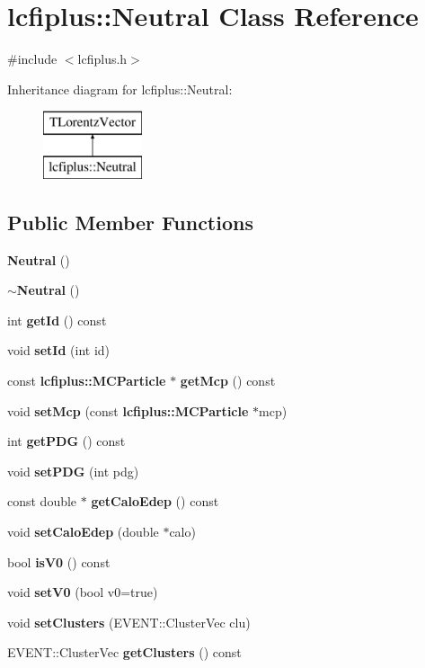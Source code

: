 \section{lcfiplus\+:\+:Neutral Class Reference}
\label{classlcfiplus_1_1Neutral}


{\ttfamily \#include $<$lcfiplus.\+h$>$}

Inheritance diagram for lcfiplus\+:\+:Neutral\+:\begin{figure}[H]
\begin{center}
\leavevmode
\includegraphics[height=2.000000cm]{classlcfiplus_1_1Neutral}
\end{center}
\end{figure}
\subsection*{Public Member Functions}
\begin{DoxyCompactItemize}
\item 
\textbf{ Neutral} ()
\item 
\textbf{ $\sim$\+Neutral} ()
\item 
int \textbf{ get\+Id} () const
\item 
void \textbf{ set\+Id} (int id)
\item 
const \textbf{ lcfiplus\+::\+M\+C\+Particle} $\ast$ \textbf{ get\+Mcp} () const
\item 
void \textbf{ set\+Mcp} (const \textbf{ lcfiplus\+::\+M\+C\+Particle} $\ast$mcp)
\item 
int \textbf{ get\+P\+DG} () const
\item 
void \textbf{ set\+P\+DG} (int pdg)
\item 
const double $\ast$ \textbf{ get\+Calo\+Edep} () const
\item 
void \textbf{ set\+Calo\+Edep} (double $\ast$calo)
\item 
bool \textbf{ is\+V0} () const
\item 
void \textbf{ set\+V0} (bool v0=true)
\item 
void \textbf{ set\+Clusters} (E\+V\+E\+N\+T\+::\+Cluster\+Vec clu)
\item 
E\+V\+E\+N\+T\+::\+Cluster\+Vec \textbf{ get\+Clusters} () const
\end{DoxyCompactItemize}


